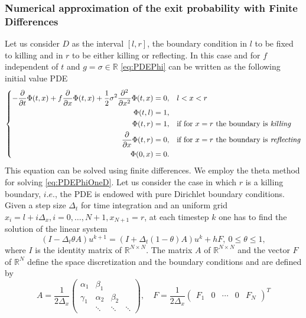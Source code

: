 \subsubsection{Numerical approximation of the exit probability with Finite Differences}

Let us consider $D$ as the interval $\left[ l,r \right]$, the boundary condition in $l$ to be fixed to killing and in $r$ to be either killing or reflecting. In this case and for $f$ independent of $t$ and $g = \sigma \in \mathbb{R}$ \eqref{eq:PDEPhi} can be written as the following initial value PDE 
\begin{equation}\label{eq:PDEPhiOneD}
\left \{
\begin{aligned}
	-\frac{\partial}{\partial t} \Phi(t,x) + f\frac{\partial}{\partial x} \Phi(t,x) + \frac{1}{2}\sigma^2 \frac{\partial^2}{\partial x^2} \Phi(t,x) &= 0, && l < x < r \\
	\Phi(t,l) &= 1, \\
	\Phi(t,r) &= 1, && \text{if for $x = r$ the boundary is \textit{killing}} \\
	\frac{\partial}{\partial x}\Phi(t,r) &= 0, && \text{if for $x = r$ the boundary is \textit{reflecting}} \\
	\Phi(0,x) &= 0.
\end{aligned} \right .
\end{equation}
This equation can be solved using finite differences. We employ the theta method for solving \eqref{eq:PDEPhiOneD}. Let us consider the case in which $r$ is a killing boundary, $i.e.$, the PDE is endowed with pure Dirichlet boundary conditions. Given a step size $\Delta_t$ for time integration and an uniform grid $x_i = l + i\Delta_x, i=0,\dots,N+1, x_{N+1} = r$, at each timestep $k$ one has to find the solution of the linear system
\begin{equation}\label{eq:ThetaMethod}
	(I - \Delta_t\theta A) u^{k+1} = (I + \Delta_t(1-\theta) A)u^k + hF, \: 0 \leq \theta \leq 1,
\end{equation}
where $I$ is the identity matrix of $\mathbb{R}^{N\times N}$. The matrix $A$ of $\mathbb{R}^{N\times N}$ and the vector $F$ of $\mathbb{R}^N$ define the space discretization and the boundary conditions and are defined by
\begin{equation}\label{eq:ThetaMethodAandF}
	A = \frac{1}{2\Delta_x}\begin{pmatrix} 	\alpha_1 & \beta_1  &  	      &\\
						\gamma_1 & \alpha_2 & \beta_2 &\\
							 & \ddots   & \ddots  & \ddots \end{pmatrix}, \quad F = \frac{1}{2\Delta_x}\begin{pmatrix} F_1 & 0 & \cdots & 0 & F_N \end{pmatrix}^T
\end{equation}
